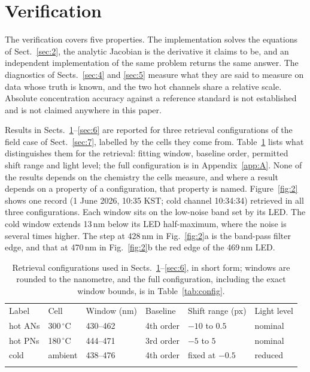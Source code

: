 \section{Verification}
\label{sec:3}

The verification covers five properties. The implementation solves the equations of Sect.~\ref{sec:2}, the analytic
Jacobian is the derivative it claims to be, and an independent implementation of the same problem returns the same
answer. The diagnostics of Sects.~\ref{sec:4} and \ref{sec:5} measure what they are said to measure on data whose
truth is known, and the two hot channels share a relative scale. Absolute concentration accuracy
against a reference standard is not established and is not claimed anywhere in this paper.

Results in Sects.~\ref{sec:3}--\ref{sec:6} are reported for three retrieval configurations of the field case of
Sect.~\ref{sec:7}, labelled by the cells they come from. Table~\ref{tab:1} lists what distinguishes them for the
retrieval: fitting window, baseline order, permitted shift range and light level; the full configuration is in
Appendix~\ref{app:A}. None of the results depends on the chemistry the cells measure, and where a result depends on a
property of a configuration, that property is named. Figure~\ref{fig:2} shows one record (1 June 2026, 10:35 KST; cold channel 10:34:34) retrieved in all three
configurations. Each window sits on the low-noise band set by its LED. The cold window extends 13\,nm below its LED
half-maximum, where the noise is several times higher. The step at 428\,nm in Fig.~\ref{fig:2}a is the band-pass filter
edge, and that at 470\,nm in Fig.~\ref{fig:2}b the red edge of the 469\,nm LED.

\begin{table}[t]
\caption{Retrieval configurations used in Sects.~\ref{sec:3}--\ref{sec:6}, in short form; windows are rounded to the nanometre, and the full configuration, including the exact window bounds, is in Table~\ref{tab:config}.}
\label{tab:1}
\begin{tabular}{llllll}
\tophline
Label & Cell & Window (nm) & Baseline & Shift range (px) & Light level \\
\middlehline
hot ANs & 300\,$^{\circ}$C & 430--462 & 4th order & $-10$ to $0.5$ & nominal \\
hot PNs & 180\,$^{\circ}$C & 444--471 & 3rd order & $-5$ to $5$ & nominal \\
cold & ambient & 438--476 & 4th order & fixed at $-0.5$ & reduced \\
\bottomhline
\end{tabular}
\end{table}

